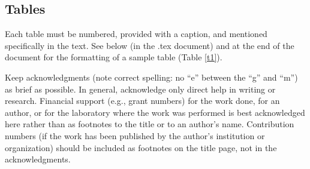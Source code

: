\documentclass{ametsoc}
\begin{document}
\subsection{Tables}
Each table must be numbered, provided with a caption, and mentioned
specifically in the text. 
See below (in the .tex document) and at the end of the document for the formatting of a sample table (Table
\ref{t1}).


\acknowledgments
Keep acknowledgments (note correct spelling: no ``e'' between the ``g'' and
``m'') as brief as possible. In general, acknowledge only direct help in
writing or research. Financial support (e.g., grant numbers) for the work
done, for an author, or for the laboratory where the work was performed is
best acknowledged here rather than as footnotes to the title or to an
author's name. Contribution numbers (if the work has been published by the
author's institution or organization) should be included as footnotes on the title page,
not in the acknowledgments.



\end{document}
